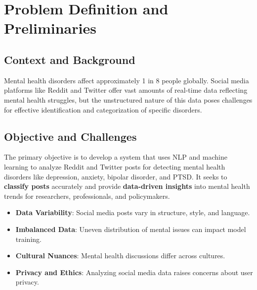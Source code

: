 \pagebreak
\section{Problem Definition and Preliminaries}

\begin{comment}
    State the problem you have solved. Define the boundaries of your project. What was included (scope) and what was not (exclusions)?
\vspace{.1in}

\noindent
Briefly explain the methods you used to conduct your research or complete the project. Were there specific tools, techniques or libraries employed?
\end{comment}

\subsection{Context and Background}
\noindent
Mental health disorders affect approximately 1 in 8 people globally. Social media platforms like Reddit and Twitter offer vast amounts of real-time data reflecting mental health struggles, but the unstructured nature of this data poses challenges for effective identification and categorization of specific disorders.

\subsection{Objective and Challenges}
\noindent
The primary objective is to develop a system that uses NLP and machine learning to analyze Reddit and Twitter posts for detecting mental health disorders like depression, anxiety, bipolar disorder, and PTSD. It seeks to \textbf{classify posts} accurately and provide \textbf{data-driven insights} into mental health trends for researchers, professionals, and policymakers.

\begin{itemize}
    \item \textbf{Data Variability}: Social media posts vary in structure, style, and language.
    \item \textbf{Imbalanced Data}: Uneven distribution of mental issues can impact model training.
    \item \textbf{Cultural Nuances}: Mental health discussions differ across cultures.
    \item \textbf{Privacy and Ethics}: Analyzing social media data raises concerns about user privacy.
\end{itemize}


